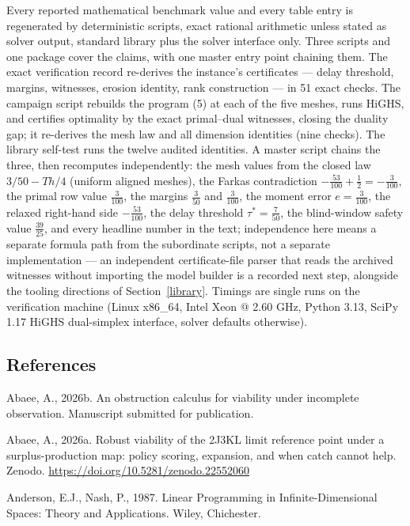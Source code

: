 \documentclass[10pt,twocolumn]{article}
\theoremstyle{plain}
\theoremstyle{definition}
\theoremstyle{remark}
\begin{document}
Every reported mathematical benchmark value and every table entry is
regenerated by deterministic scripts, exact rational arithmetic unless
stated as solver output, standard library plus the solver interface only.
Three scripts and one package cover the claims, with one master entry
point chaining them. The exact
verification record re-derives the instance's certificates --- delay
threshold, margins, witnesses, erosion identity, rank construction ---
in 51 exact checks. The campaign script rebuilds the program (5) at each of
the five meshes, runs HiGHS, and certifies optimality by the exact
primal--dual witnesses, closing the duality gap; it re-derives the mesh law
and all dimension identities (nine checks). The library self-test runs the
twelve audited identities. A master script chains the three, then
recomputes independently: the mesh values from the closed law
\(3/50 - Th/4\) (uniform aligned meshes), the Farkas contradiction
\(-\tfrac{53}{100} + \tfrac12 = -\tfrac{3}{100}\), the primal row value
\(\tfrac{3}{100}\), the margins \(\tfrac{3}{50}\) and \(\tfrac{3}{100}\),
the moment error \(e = \tfrac{3}{100}\), the relaxed right-hand side
\(-\tfrac{53}{100}\), the delay threshold \(\tau^{*} = \tfrac{7}{50}\), the blind-window safety value \(\tfrac{39}{25}\), and every headline
number in the text; independence here means a separate formula path from
the subordinate scripts, not a separate implementation --- an independent
certificate-file parser that reads the archived witnesses without
importing the model builder is a recorded next step, alongside
the tooling directions of Section~\ref{library}. Timings are single runs on the verification
machine (Linux x86\_64, Intel Xeon @ 2.60 GHz, Python 3.13, SciPy 1.17
HiGHS dual-simplex interface, solver defaults otherwise).

\subsection*{References}

Abaee, A., 2026b. An obstruction calculus for viability under incomplete
observation. Manuscript submitted for publication.

Abaee, A., 2026a. Robust viability of the 2J3KL limit reference point
under a surplus-production map: policy scoring, expansion, and when catch
cannot help. Zenodo. \url{https://doi.org/10.5281/zenodo.22552060}

Anderson, E.J., Nash, P., 1987. Linear Programming in Infinite-Dimensional
Spaces: Theory and Applications. Wiley, Chichester.
\end{document}
